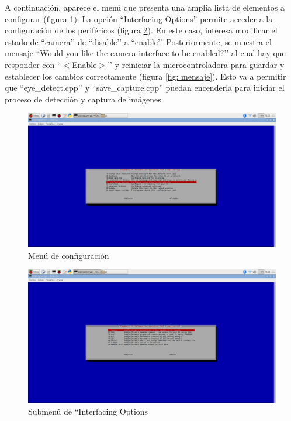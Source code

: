     
A continuación, aparece el menú que presenta una amplia lista de elementos a configurar (figura \ref{fig: menu}). La opción ``Interfacing Options'' permite acceder a la configuración de los periféricos (figura \ref{fig: submenu}). 
En este caso, interesa modificar el estado de ``camera’’ de ``disable’’ a ``enable’’. Posteriormente, se muestra el mensaje ``Would you like the camera interface to be enabled?’’ al cual hay que responder con ``$\lessdot$Enable$\gtrdot$’’ y reiniciar la microcontroladora para guardar y establecer los cambios correctamente (figura \ref{fig: mensaje}). Esto va a permitir que ``eye\_detect.cpp’’ y ``save\_capture.cpp'' puedan encenderla para iniciar el proceso de detección y captura de imágenes.

    \begin{figure}[H]
    \centering
    \includegraphics[scale = 0.25]{capitulo_04/figuras_dir/actp1.jpg}
    \caption{Menú de configuración}
    \label{fig: menu}
    \end{figure}
    
        \begin{figure}
    \centering
    \includegraphics[scale = 0.25]{capitulo_04/figuras_dir/actp2.jpg}
    \caption{Submenú de ``Interfacing Options}
    \label{fig: submenu}
    \end{figure}
    


